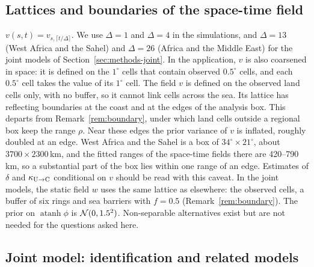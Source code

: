 \subsection{Lattices and boundaries of the space-time field}\label{supp:methods-st}

$v(s,t) = v_{s,\lceil t/\Delta \rceil}$. We use $\Delta = 1$ and $\Delta = 4$ in the
simulations, and $\Delta = 13$ (West Africa and the Sahel) and $\Delta = 26$ (Africa
and the Middle East) for the joint models of Section~\ref{sec:methods-joint}. In the
application, $v$ is also coarsened in space: it is defined on the $1^\circ$ cells that
contain observed $0.5^\circ$ cells, and each $0.5^\circ$ cell takes the value of its
$1^\circ$ cell. The field $v$ is defined on the observed land cells only, with no
buffer, so it cannot link cells across the sea. Its lattice has reflecting boundaries
at the coast and at the edges of the analysis box. This departs from
Remark~\ref{rem:boundary}, under which land cells outside a regional box keep the
range $\rho$. Near these edges the prior variance of $v$ is inflated, roughly doubled
at an edge. West Africa and the Sahel is a box of $34^\circ \times 21^\circ$, about
$3700 \times 2300$\,km, and the fitted ranges of the space-time fields there are
420--790\,km, so a substantial part of the box lies within one range of an edge.
Estimates of $\delta$ and $\kappa_{\mathrm{U}\to\mathrm{C}}$ conditional on $v$ should be read with this caveat.
In the joint models, the static field $w$ uses the same lattice
as elsewhere: the observed cells, a buffer of six rings and sea barriers with
$f = 0.5$ (Remark~\ref{rem:boundary}). The prior on
$\operatorname{atanh}\phi$ is $\mathcal{N}(0, 1.5^2)$. Non-separable alternatives exist
\citep{lindgren2024diffusion} but are not needed for the questions asked here.

\subsection{Joint model: identification and related models}\label{supp:methods-joint}

